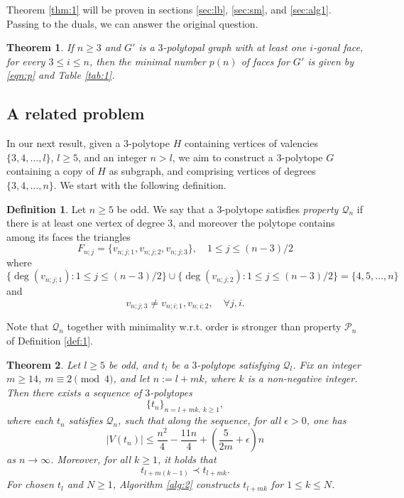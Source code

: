 \documentclass[11pt]{article}
\newcounter{countp}
\newtheorem{thm}{Theorem}%
\newtheorem{thmp}[countp]{Theorem}
\theoremstyle{definition}
\newtheorem{defin}[thm]{Definition}
\newtheorem{rem}[thm]{Remark}
\numberwithin{equation}{section}
\def\calP{\mathcal{P}}
\def\calQ{\mathcal{Q}}
\begin{document}
Theorem \ref{thm:1} will be proven in sections \ref{sec:lb}, \ref{sec:sm}, and \ref{sec:alg1}. Passing to the duals, we can answer the original question.
\begin{thmp}
If $n\geq 3$ and $G'$ is a $3$-polytopal graph with at least one $i$-gonal face, for every $3\leq i\leq n$, then the minimal number $p(n)$ of faces for $G'$ is given by \eqref{eqn:p} and Table \ref{tab:1}.
\end{thmp}


\subsection{A related problem}
In our next result, given a $3$-polytope $H$ containing vertices of valencies $\{3,4,\dots, l\}$, $l\geq 5$, and an integer $n>l$, we aim to construct a $3$-polytope $G$ containing a copy of $H$ as subgraph, and comprising vertices of degrees $\{3,4,\dots, n\}$. We start with the following definition.
\begin{defin}
	\label{def:2}
Let $n\geq 5$ be odd. We say that a $3$-polytope satisfies \textit{property $\calQ_n$} if there is at least one vertex of degree $3$, and moreover the polytope contains among its faces the triangles
\begin{equation}
\label{eqn:faces}
F_{n;j}=\{v_{n;j;1}, v_{n;j;2}, v_{n;j;3}\}, \quad 1\leq j\leq(n-3)/2
\end{equation}
where
\begin{equation}
\label{eqn:odd}
\{\deg(v_{n;j;1}) : 1\leq j\leq(n-3)/2\} \cup \{\deg(v_{n;j;2}) : 1\leq j\leq(n-3)/2\}=\{4,5,\dots,n\}
\end{equation}
and
\[v_{n;j;3}\neq v_{n;i;1},v_{n;i;2},  \quad\forall j,i.\]
\end{defin}

Note that $\calQ_n$ together with minimality w.r.t. order is stronger than property $\calP_n$ of Definition \ref{def:1}.


\begin{thm}
	\label{thm:2}
Let $l\geq 5$ be odd, and $t_l$ be a $3$-polytope satisfying $\calQ_l$. Fix an integer $m\geq 14$, $m\equiv 2 \pmod 4$, and let $n:=l+mk$, where $k$ is a non-negative integer. Then there exists a sequence of $3$-polytopes
\[\{t_n\}_{n=l+mk, \ k\geq 1},\]
where each $t_n$ satisfies $\calQ_{n}$, such that along the sequence, for all $\epsilon>0$, one has
\begin{equation}
\label{eqn:ordt}
|V(t_n)|\leq\frac{n^2}{4}-\frac{11n}{4}+\left(\frac{5}{2m}+\epsilon\right)n
\end{equation}
as $n\to\infty$. Moreover, for all $k\geq 1$, it holds that
\begin{equation}
\label{eqn:subt}
t_{l+m(k-1)}\prec t_{l+mk}.
\end{equation}
For chosen $t_l$ and $N\geq 1$, Algorithm \ref{alg:2} constructs $t_{l+mk}$ for $1\leq k\leq N$.
\end{thm}
\end{document}
